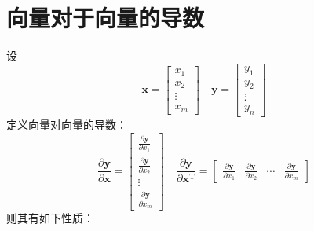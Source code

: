 \documentclass[UTF8,space=auto]{ctexart} %
\begin{document}
\section{向量对于向量的导数}
设
\[
\mathbf{x} =
\begin{bmatrix}
	x_1 \\ x_2 \\ \vdots \\ x_m
\end{bmatrix}\quad
\mathbf{y} =
\begin{bmatrix}
	y_1 \\ y_2 \\ \vdots \\ y_n
\end{bmatrix}
\]
定义向量对向量的导数：
\[
\frac{\partial\mathbf{y}}{\partial\mathbf{x}}
= \begin{bmatrix}
	\frac{\partial \mathbf{y}}{\partial x_1} \\
	\frac{\partial \mathbf{y}}{\partial x_2} \\
	\vdots \\
	\frac{\partial \mathbf{y}}{\partial x_m}
\end{bmatrix}\quad
\frac{\partial\mathbf{y}}{\partial\mathbf{x}^{\mathrm{T}}}
= \begin{bmatrix}
	\frac{\partial \mathbf{y}}{\partial x_1} &
	\frac{\partial \mathbf{y}}{\partial x_2} &
	\cdots &
	\frac{\partial \mathbf{y}}{\partial x_m}
\end{bmatrix}
\]
则其有如下性质：
\end{document}
